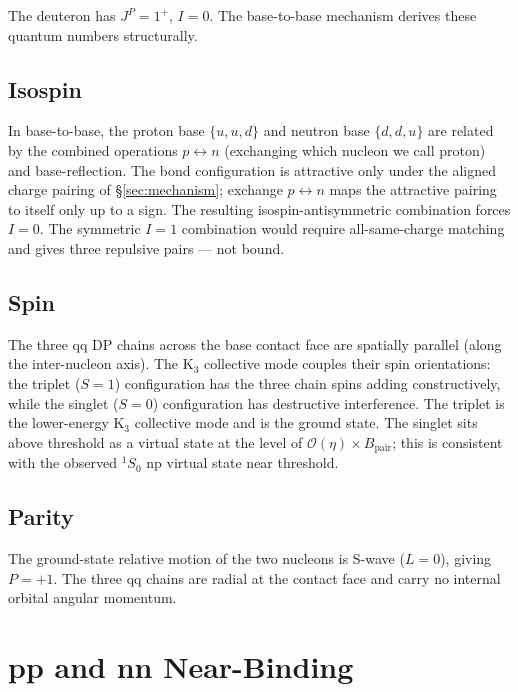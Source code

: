 \documentclass[11pt,letterpaper]{article}
\newcommand{\Bpair}{B_{\mathrm{pair}}}
\begin{document}
The deuteron has $J^P = 1^+$, $I = 0$. The base-to-base mechanism derives these quantum numbers structurally.

\subsection{Isospin}

In base-to-base, the proton base $\{u, u, d\}$ and neutron base $\{d, d, u\}$ are related by the combined operations $p \leftrightarrow n$ (exchanging which nucleon we call proton) and base-reflection. The bond configuration is attractive only under the aligned charge pairing of §\ref{sec:mechanism}; exchange $p \leftrightarrow n$ maps the attractive pairing to itself only up to a sign. The resulting isospin-antisymmetric combination forces $I = 0$. The symmetric $I = 1$ combination would require all-same-charge matching and gives three repulsive pairs --- not bound.

\subsection{Spin}

The three qq DP chains across the base contact face are spatially parallel (along the inter-nucleon axis). The K$_3$ collective mode couples their spin orientations: the triplet ($S = 1$) configuration has the three chain spins adding constructively, while the singlet ($S = 0$) configuration has destructive interference. The triplet is the lower-energy K$_3$ collective mode and is the ground state. The singlet sits above threshold as a virtual state at the level of $\mathcal{O}(\eta) \times \Bpair$; this is consistent with the observed $^1S_0$ np virtual state near threshold.

\subsection{Parity}

The ground-state relative motion of the two nucleons is S-wave ($L = 0$), giving $P = +1$. The three qq chains are radial at the contact face and carry no internal orbital angular momentum.

\section{pp and nn Near-Binding}
\label{sec:pp_nn}
\end{document}

